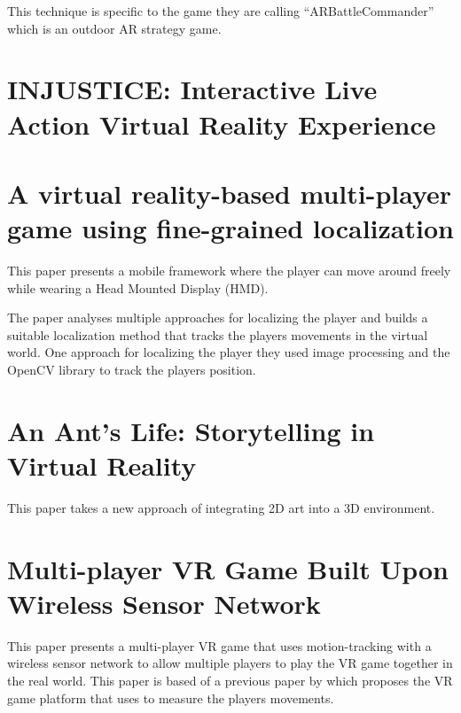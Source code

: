 \documentclass{scrartcl}
\begin{document}
This technique is specific to the game they are calling ``ARBattleCommander'' which is an outdoor AR strategy game.


\section{ INJUSTICE: Interactive Live Action Virtual Reality Experience \cite{Cho:2016}}

\section{A virtual reality-based multi-player game using fine-grained localization \cite{de2015virtual}}
This paper presents a mobile framework where the player can move around freely while wearing a Head Mounted Display (HMD). 

The paper analyses multiple approaches for localizing the player and builds a suitable localization method that tracks the players movements in the virtual world. 
One approach for localizing the player they used image processing and the OpenCV library to track the players position.

\section{An Ant's Life: Storytelling in Virtual Reality \cite{Leo:2015}}
This paper takes a new approach of integrating 2D art into a 3D environment.

\section{ Multi-player VR Game Built Upon Wireless Sensor Network \cite{Jee:2008}}
This paper presents a multi-player VR game that uses motion-tracking with a wireless sensor network to allow multiple players to play the VR game together in the real world.
This paper is based of a previous paper by \cite{Eom:2006} which proposes the VR game platform that uses  to measure the players movements.



\end{document}
